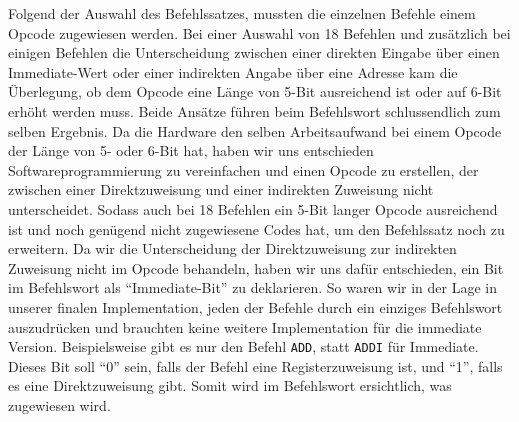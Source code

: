 \documentclass[paper=a4,fontsize=12pt,twocolumn]{scrreprt}
\begin{document}

Folgend der Auswahl des Befehlssatzes, mussten die einzelnen Befehle einem Opcode zugewiesen werden.
Bei einer Auswahl von 18 Befehlen und zusätzlich bei einigen Befehlen die Unterscheidung zwischen einer direkten Eingabe über einen Immediate-Wert oder einer indirekten Angabe über eine Adresse kam die Überlegung, ob dem Opcode eine Länge von 5-Bit ausreichend ist oder auf 6-Bit erhöht werden muss.
Beide Ansätze führen beim Befehlswort schlussendlich zum selben Ergebnis.
Da die Hardware den selben Arbeitsaufwand bei einem Opcode der Länge von 5- oder 6-Bit hat, haben wir uns entschieden Softwareprogrammierung zu vereinfachen und einen Opcode zu erstellen, der zwischen einer Direktzuweisung und einer indirekten Zuweisung nicht unterscheidet.
Sodass auch bei 18 Befehlen ein 5-Bit langer Opcode ausreichend ist und noch genügend nicht zugewiesene Codes hat, um den Befehlssatz noch zu erweitern.
Da wir die Unterscheidung der Direktzuweisung zur indirekten Zuweisung nicht im Opcode behandeln, haben wir uns dafür entschieden, ein Bit im Befehlswort als \enquote{Immediate-Bit} zu deklarieren.
So waren wir in der Lage in unserer finalen Implementation, jeden der Befehle durch ein einziges Befehlswort auszudrücken und brauchten keine weitere Implementation für die immediate Version.
Beispielsweise gibt es nur den Befehl \texttt{ADD}, statt \texttt{ADDI} für Immediate.
Dieses Bit soll \enquote{0} sein, falls der Befehl eine Registerzuweisung ist, und \enquote{1}, falls es eine Direktzuweisung gibt.
Somit wird im Befehlswort ersichtlich, was zugewiesen wird.
\end{document}
